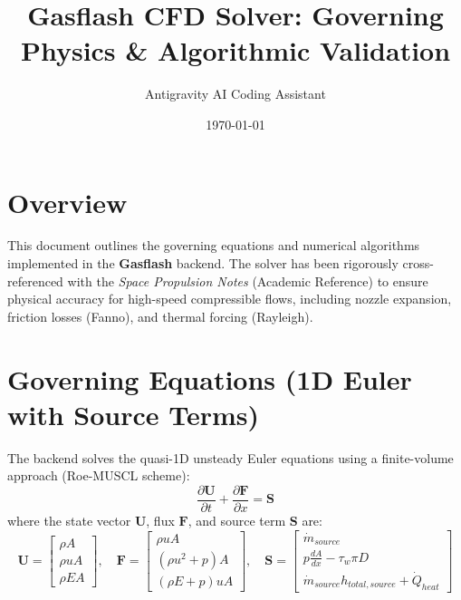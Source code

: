 \documentclass[11pt,a4paper]{article}
\title{\textbf{Gasflash CFD Solver: Governing Physics \& Algorithmic Validation}}
\author{Antigravity AI Coding Assistant}
\date{\today}
\begin{document}
\maketitle

\section{Overview}
This document outlines the governing equations and numerical algorithms implemented in the \textbf{Gasflash} backend. The solver has been rigorously cross-referenced with the \textit{Space Propulsion Notes} (Academic Reference) to ensure physical accuracy for high-speed compressible flows, including nozzle expansion, friction losses (Fanno), and thermal forcing (Rayleigh).

\section{Governing Equations (1D Euler with Source Terms)}
The backend solves the quasi-1D unsteady Euler equations using a finite-volume approach (Roe-MUSCL scheme):
\begin{equation}
    \frac{\partial \mathbf{U}}{\partial t} + \frac{\partial \mathbf{F}}{\partial x} = \mathbf{S}
\end{equation}
where the state vector $\mathbf{U}$, flux $\mathbf{F}$, and source term $\mathbf{S}$ are:
\begin{equation}
    \mathbf{U} = \begin{bmatrix} \rho A \\ \rho u A \\ \rho E A \end{bmatrix}, \quad 
    \mathbf{F} = \begin{bmatrix} \rho u A \\ (\rho u^2 + p) A \\ (\rho E + p) u A \end{bmatrix}, \quad
    \mathbf{S} = \begin{bmatrix} \dot{m}_{source} \\ p \frac{dA}{dx} - \tau_w \pi D \\ \dot{m}_{source} h_{total, source} + \dot{Q}_{heat} \end{bmatrix}
\end{equation}
\end{document}
